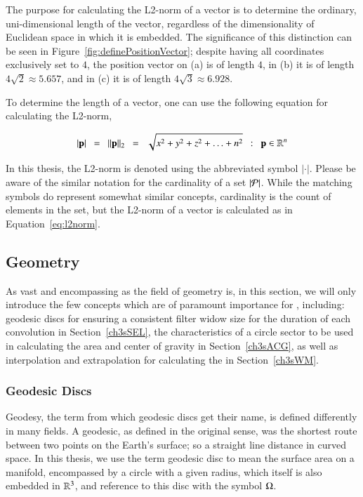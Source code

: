 The purpose for calculating the L2-norm of a vector is to determine the ordinary, uni-dimensional length of the vector, regardless of the dimensionality of Euclidean space in which it is embedded. The significance of this distinction can be seen in Figure~\ref{fig:definePositionVector}; despite having all coordinates exclusively set to $4$, the position vector on (a) is of length $4$, in (b) it is of length $4\sqrt{2} \approx 5.657$, and in (c) it is of length $4\sqrt{3} \approx 6.928$.

To determine the length of a vector, one can use the following equation for calculating the L2-norm,

\begin{equation}
	|\mathbf{p}| \enspace=\enspace \|\mathbf{p}\|_2 \enspace=\enspace \sqrt{x^2 + y^2 + z^2 + \ldots + n^2} \enspace:\enspace \mathbf{p} \in \mathbb{R}^{n}
	\label{eq:l2norm}
\end{equation}

In this thesis, the L2-norm is denoted using the abbreviated symbol $|\cdot|$. Please be aware of the similar notation for the cardinality of a set $|\mathcal{P}|$. While the matching symbols do represent somewhat similar concepts, cardinality is the count of elements in the set, but the L2-norm of a vector is calculated as in Equation~\ref{eq:l2norm}.~\cite[p.~26]{Mara12}

%
%
%
%
\subsection{Geometry}
\label{ch2sETBssG}
As vast and encompassing as the field of geometry is, in this section, we will only introduce the few concepts which are of paramount importance for , including: geodesic discs for ensuring a consistent filter widow size for the duration of each convolution in Section~\ref{ch3sSEL}, the characteristics of a circle sector to be used in calculating the area and center of gravity in Section~\ref{ch3sACG}, as well as interpolation and extrapolation for calculating the  in Section~\ref{ch3sWM}.

%
%
\subsubsection{Geodesic Discs}
\label{ch2sETBssGsssGD}
Geodesy, the term from which geodesic discs get their name, is defined differently in many fields. A geodesic, as defined in the original sense, was the shortest route between two points on the Earth's surface; so a straight line distance in curved space. In this thesis, we use the term geodesic disc to mean the surface area on a manifold, encompassed by a circle with a given radius, which itself is also embedded in $\mathbb{R}^{3}$, and reference to this disc with the symbol $\Omega$.

